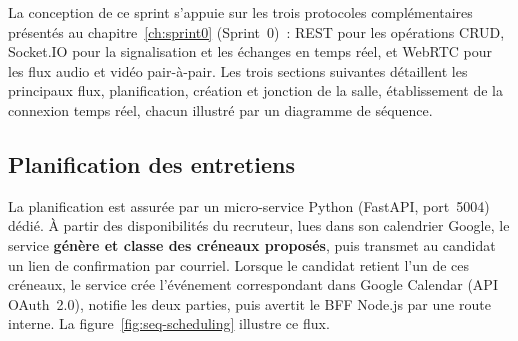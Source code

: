 La conception de ce sprint s'appuie sur les trois protocoles complémentaires présentés au chapitre~\ref{ch:sprint0} (Sprint~0)~: REST pour les opérations CRUD, Socket.IO pour la signalisation et les échanges en temps réel, et WebRTC pour les flux audio et vidéo pair-à-pair. Les trois sections suivantes détaillent les principaux flux, planification, création et jonction de la salle, établissement de la connexion temps réel, chacun illustré par un diagramme de séquence.

\subsection{Planification des entretiens}

La planification est assurée par un micro-service Python (FastAPI, port~5004) dédié. À partir des disponibilités du recruteur, lues dans son calendrier Google, le service \textbf{génère et classe des créneaux proposés}, puis transmet au candidat un lien de confirmation par courriel. Lorsque le candidat retient l'un de ces créneaux, le service crée l'événement correspondant dans Google Calendar (API OAuth~2.0), notifie les deux parties, puis avertit le BFF Node.js par une route interne. La figure~\ref{fig:seq-scheduling} illustre ce flux.

